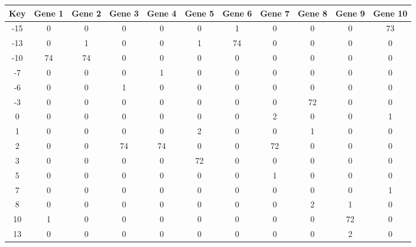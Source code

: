 \begin{tabular}{|c|c|c|c|c|c|c|c|c|c|c|}
\hline
Key & Gene 1 & Gene 2 & Gene 3 & Gene 4 & Gene 5 & Gene 6 & Gene 7 & Gene 8 & Gene 9 & Gene 10 \\
\hline
-15 & 0 & 0 & 0 & 0 & 0 & 1 & 0 & 0 & 0 & 73 \\
-13 & 0 & 1 & 0 & 0 & 1 & 74 & 0 & 0 & 0 & 0 \\
-10 & 74 & 74 & 0 & 0 & 0 & 0 & 0 & 0 & 0 & 0 \\
-7 & 0 & 0 & 0 & 1 & 0 & 0 & 0 & 0 & 0 & 0 \\
-6 & 0 & 0 & 1 & 0 & 0 & 0 & 0 & 0 & 0 & 0 \\
-3 & 0 & 0 & 0 & 0 & 0 & 0 & 0 & 72 & 0 & 0 \\
0 & 0 & 0 & 0 & 0 & 0 & 0 & 2 & 0 & 0 & 1 \\
1 & 0 & 0 & 0 & 0 & 2 & 0 & 0 & 1 & 0 & 0 \\
2 & 0 & 0 & 74 & 74 & 0 & 0 & 72 & 0 & 0 & 0 \\
3 & 0 & 0 & 0 & 0 & 72 & 0 & 0 & 0 & 0 & 0 \\
5 & 0 & 0 & 0 & 0 & 0 & 0 & 1 & 0 & 0 & 0 \\
7 & 0 & 0 & 0 & 0 & 0 & 0 & 0 & 0 & 0 & 1 \\
8 & 0 & 0 & 0 & 0 & 0 & 0 & 0 & 2 & 1 & 0 \\
10 & 1 & 0 & 0 & 0 & 0 & 0 & 0 & 0 & 72 & 0 \\
13 & 0 & 0 & 0 & 0 & 0 & 0 & 0 & 0 & 2 & 0 \\
\hline
\end{tabular}